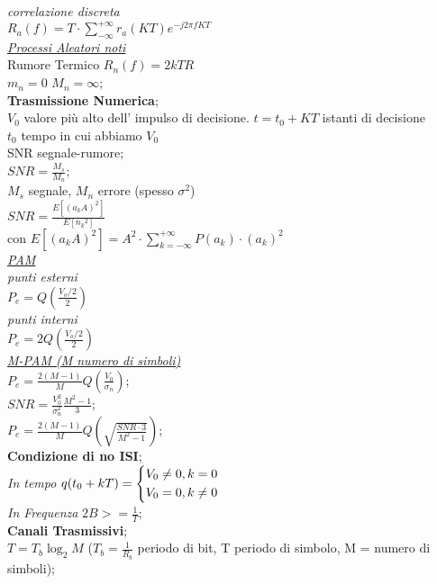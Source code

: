 \documentclass[a4paper]{article}
\begin{document}
\begin{multicols*}{3}
\textit{correlazione discreta} \\
$R_a(f)=T\cdot\sum_{-\infty}^{+\infty}r_a(KT)e^{-j2\pi fKT}$ \\
\underline{\textit{Processi Aleatori noti}} \\
Rumore Termico $R_n(f)=2kTR$ \\
$m_n=0$ $M_n=\infty$; \\
\textbf{Trasmissione Numerica}; \\
$V_0$ valore più alto dell' impulso di decisione. 
$t=t_0 + KT$ istanti di decisione\\
$t_0$ tempo in cui abbiamo $V_0$ \\
SNR segnale-rumore; \\
$SNR=\frac{M_s}{M_n}$; \\ $M_s$ segnale, $M_n$ errore (spesso $\sigma^2$) \\ 
$SNR=\frac{E[{(a_k A)}^{2}]}{E[{n_k}^{2}]}$ \\
con $E[{(a_k A)}^{2}] = {A}^{2}\cdot \sum_{k=-\infty}^{+\infty}{P(a_k)\cdot {(a_k)}^{2}}$\\
\underline{\textit{PAM}} \\
\textit{punti esterni}\\
$P_e = Q(\frac{V_o / 2}{2}) $ \\
\textit{punti interni }\\
$P_e = 2Q(\frac{V_o / 2}{2}) $ \\
\underline{\textit{M-PAM (M numero di simboli) }} \\
$P_e = \frac{2(M-1)}{M}Q(\frac{V_0}{\sigma_n})$;\\
$SNR = \frac{V_0^2}{\sigma_n^2}\frac{M^2-1}{3}$; \\
$P_e = \frac{2(M-1)}{M}Q(\sqrt{\frac{SNR \cdot 3}{M^2-1}})$; \\
\textbf{Condizione di no ISI}; \\
\textit{In tempo}
 $ q(t_{0}+kT)=
\begin{dcases}
    V_0\ne0 , k=0  \\
    V_0=0, k\ne0  \\
\end{dcases}
$ \\
\textit{In Frequenza}
$2B >= \frac{1}{T}$; \\
\textbf{Canali Trasmissivi}; \\
$T=T_b \log_{2}{M}$ ($T_b = \frac{1}{R_b}$ periodo di bit, T periodo di simbolo,
M = numero di simboli);\\

\end{multicols*}
\end{document}
